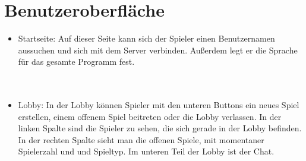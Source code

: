 \documentclass{article}
\begin{document}
\section{Benutzeroberfläche}
\begin{itemize}
	\item Startseite:  Auf dieser Seite kann sich der Spieler einen Benutzernamen aussuchen und sich mit dem \gls{Server} verbinden. Außerdem legt er die Sprache für das gesamte Programm fest.\\ 				\ \\
		\ \\
	\item \gls{Lobby}: In der \gls{Lobby} können Spieler mit den unteren Buttons ein neues Spiel erstellen,  einem offenem Spiel 					beitreten oder die \gls{Lobby} verlassen. In der linken Spalte sind die Spieler zu sehen, die sich gerade in der 					\gls{Lobby} befinden. In der rechten Spalte sieht 					man die offenen Spiele, mit momentaner Spielerzahl und und Spieltyp. Im unteren Teil der \gls{Lobby} ist der Chat.\\
		\ \\

\end{itemize}
\end{document}
